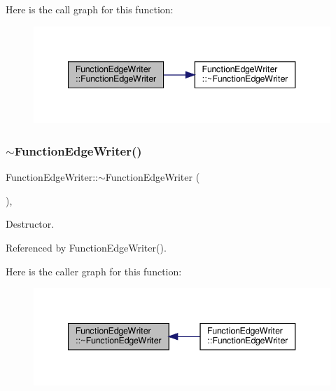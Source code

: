 Here is the call graph for this function\+:
\nopagebreak
\begin{figure}[H]
\begin{center}
\leavevmode
\includegraphics[width=340pt]{dd/dea/classFunctionEdgeWriter_ac4ea641ac563ef834f68da6da35465e8_cgraph}
\end{center}
\end{figure}
\mbox{\label{classFunctionEdgeWriter_aebd3f659a0ad7263d6326d26124e300b}} 
\subsubsection{\texorpdfstring{$\sim$\+Function\+Edge\+Writer()}{~FunctionEdgeWriter()}}
{\footnotesize\ttfamily Function\+Edge\+Writer\+::$\sim$\+Function\+Edge\+Writer (\begin{DoxyParamCaption}{ }\end{DoxyParamCaption})\hspace{0.3cm}{\ttfamily [override]}, {\ttfamily [default]}}



Destructor. 



Referenced by Function\+Edge\+Writer().

Here is the caller graph for this function\+:
\nopagebreak
\begin{figure}[H]
\begin{center}
\leavevmode
\includegraphics[width=340pt]{dd/dea/classFunctionEdgeWriter_aebd3f659a0ad7263d6326d26124e300b_icgraph}
\end{center}
\end{figure}


